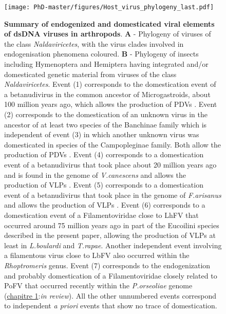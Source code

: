 \begin{figure}[!htpbt]
\texttt{[image: PhD-master/figures/Host\_virus\_phylogeny\_last.pdf]}\centering
\caption[Paper3:Recapitulastion of \textit{Naldaviricetes} EVEs in insects ]{\textbf{Summary of endogenized and domesticated viral elements of dsDNA viruses in arthropods}. \textbf{A} - Phylogeny of viruses of the class \textit{Naldaviricetes}, with the virus clades involved in endogenisation phenomena coloured. \textbf{B} - Phylogeny of insects including Hymenoptera and Hemiptera having integrated and/or domesticated genetic material from viruses of the class \textit{Naldaviricetes}. Event (1) corresponds to the domestication event of a betanudivirus in the common ancestor of Microgastroids, about 100 million years ago, which allows the production of PDVs \citep{bezier_polydnaviruses_2009}. Event (2) corresponds to the domestication of an unknown virus in the ancestor of at least two species of the Banchinae family which is independent of event (3) in which another unknown virus was domesticated in species of the Campopleginae family. Both allow the production of PDVs \citep{beliveau_genomic_2015,burke_presence_2021,legeai_genomic_2020}. Event (4) corresponds to a domestication event of a betanudivirus that took place about 20 million years ago and is found in the genome of \textit{V.canescens} and allows the production of VLPs \citep{pichon_recurrent_2015}. Event (5) corresponds to a domestication event of a betanudivirus that took place in the genome of \textit{F.arisanus} and allows the production of VLPs \citep{burke_rapid_2018}. Event (6) corresponds to a domestication event of a Filamentoviridae close to LhFV that occurred around 75 million years ago in part of the Eucoilini species described in the present paper, allowing the production of VLPs at least in \textit{L.boulardi} and \textit{T.rapae}. Another independent event involving a filamentous virus close to LbFV also occurred within the \textit{Rhoptromeris} genus. Event (7) corresponds to the endogenization and probably domestication of a Filamentoviridae closely related to PoFV that occurred recently within the \textit{P.orseoliae} genome (\hyperref[sec:chap1]{chapitre 1}:\textit{in review}). All the other unnumbered events correspond to independent \textit{a priori} events that show no trace of domestication.}
\label{figure:Host_virus_phylogeny_last}
\end{figure}


